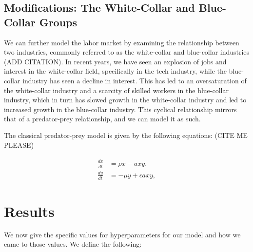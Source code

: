 \documentclass[11pt]{amsart}
\begin{document}
\subsection{Modifications: The White-Collar and Blue-Collar Groups}

We can further model the labor market by examining the relationship between two industries, commonly referred to as the white-collar and blue-collar industries (ADD CITATION).
In recent years, we have seen an explosion of jobs and interest in the white-collar field, specifically in the tech industry, while the blue-collar industry has seen a decline in interest.
This has led to an oversaturation of the white-collar industry and a scarcity of skilled workers in the blue-collar industry, which in turn has slowed growth in the white-collar industry and led to increased growth in the blue-collar industry.
This cyclical relationship mirrors that of a predator-prey relationship, and we can model it as such.

The classical predator-prey model is given by the following equations: (CITE ME PLEASE)

\begin{align}
    \begin{split}
        \frac{dx}{dt} &= \rho x - a x y, \\
        \frac{dy}{dt} &= -\mu y + \epsilon a x y,
    \end{split}
\end{align}


\section{Results}

We now give the specific values for hyperparameters for our model and how we came to those values. We define the following:
\end{document}
